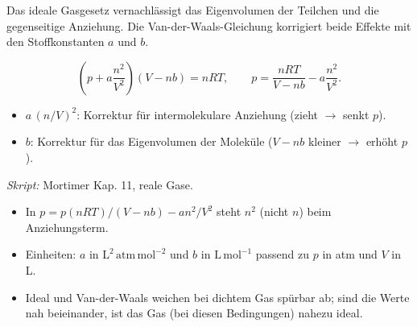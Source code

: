 

Das ideale Gasgesetz vernachl\"assigt das Eigenvolumen der Teilchen und
die gegenseitige Anziehung. Die Van-der-Waals-Gleichung korrigiert beide
Effekte mit den Stoffkonstanten $a$ und $b$.

\begin{werkzeugkasten}
\[
  \left(p + a\frac{n^2}{V^2}\right)(V - nb) = nRT,
  \qquad
  p = \frac{nRT}{V-nb} - a\frac{n^2}{V^2}.
\]
\begin{itemize}
  \item $a\,(n/V)^2$: Korrektur f\"ur intermolekulare Anziehung
        (zieht $\rightarrow$ senkt $p$).
  \item $b$: Korrektur f\"ur das Eigenvolumen der Molek\"ule
        ($V-nb$ kleiner $\rightarrow$ erh\"oht $p$).
\end{itemize}
\textit{Skript:} Mortimer Kap. 11, reale Gase.
\end{werkzeugkasten}

\begin{achtung}
\begin{itemize}
  \item In $p=p(nRT)/(V-nb)-a n^2/V^2$ steht $n^2$ (nicht $n$) beim
        Anziehungsterm.
  \item Einheiten: $a$ in $\mathrm{L^2\,atm\,mol^{-2}}$ und $b$ in
        $\mathrm{L\,mol^{-1}}$ passend zu $p$ in atm und $V$ in L.
  \item Ideal und Van-der-Waals weichen bei dichtem Gas spürbar ab; sind
        die Werte nah beieinander, ist das Gas (bei diesen Bedingungen)
        nahezu ideal.
\end{itemize}
\end{achtung}
